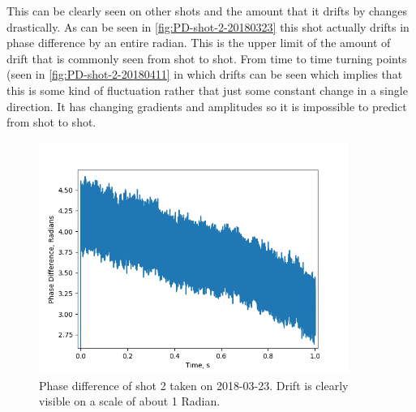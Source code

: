 \documentclass[12pt,a4paper,oneside]{report}
\begin{document}
This can be clearly seen on other shots and the amount that it drifts by changes drastically. As can be seen in \autoref{fig:PD-shot-2-20180323} this shot actually drifts in phase difference by an entire radian. This is the upper limit of the amount of drift that is commonly seen from shot to shot. From time to time turning points (seen in \autoref{fig:PD-shot-2-20180411} in which drifts can be seen which implies that this is some kind of fluctuation rather that just some constant change in a single direction. It has changing gradients and amplitudes so it is impossible to predict from shot to shot.
\begin{figure}[H] 
\includegraphics[width=0.9\textwidth, center,angle=0]{DImages/Phase_Difference_shot_2_Date_20180323-1.png}
\caption{Phase difference of shot 2 taken on 2018-03-23. Drift is clearly visible on a scale of about 1 Radian.}
\label{fig:PD-shot-2-20180323}
\end{figure}
\end{document}
